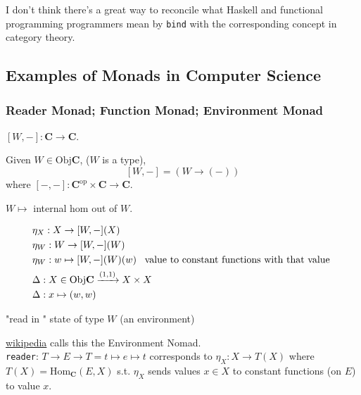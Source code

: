 \documentclass[10pt]{amsart}
\begin{document}
\begin{multicols*}{2}

I don't think there's a great way to reconcile what Haskell and functional programming programmers mean by \texttt{bind} with the corresponding concept in category theory. 

\subsection{Examples of Monads in Computer Science}


\subsubsection{Reader Monad; Function Monad; Environment Monad} $[W, -] : \mathbf{C}\to \mathbf{C}$.

Given $W \in \text{Obj}{\mathbf{C}}$, ($W$ is a type), 
\[
[W, - ] = (W \to (-))
\]
where $[-, -] : \mathbf{C}^{\text{op}} \times \mathbf{C} \to \mathbf{C}$.

$W \mapsto $ internal hom out of $W$.

\[
\begin{aligned} 
& \eta_X : X \to [W, -](X) \\ 
& \eta_W: W \to [W, -](W) \\ 
& \eta_W : w \mapsto [W,-](W)(w) \text{ \, value to constant functions with that value } \\ 
& \Delta : X \in \text{Obj}{\mathbf{C}} \xrightarrow{ (1,1) } X \times X \\ 
& \Delta : x \mapsto (w,w)
\end{aligned} 
\]

"read in " state of type $W$ (an environment)

\href{https://en.wikipedia.org/wiki/Monad_(functional_programming)#State_monads}{wikipedia} calls this the Environment Nomad. \\

\texttt{reader}: $T \to E \to T = t\mapsto e \mapsto t$ corresponds to $\eta_X : X \to T(X)$ where $T(X) = \text{Hom}_{\mathbf{C}}(E,X)$ s.t. $\eta_X$ sends values $x\in X $ to constant functions (on $E$) to value $x$. \\


\end{multicols*}
\end{document}
